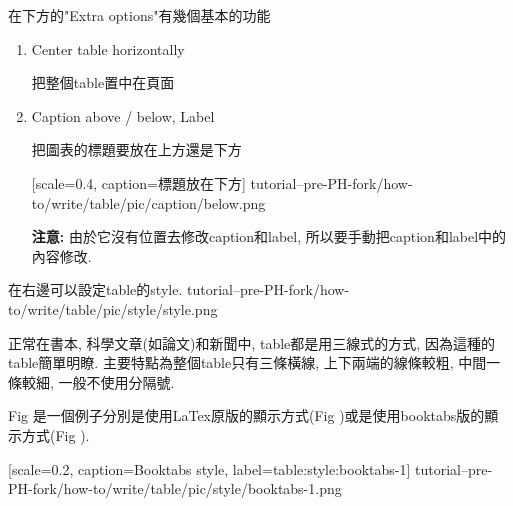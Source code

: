 \newpage
{}

  在下方的"Extra options"有幾個基本的功能

\begin{enumerate}

  \item
  {
  Center table horizontally

  把整個table置中在頁面

  } %

  \label{chapter:how-to:write:table:label-example}
  \item
  {
  Caption above / below, Label

  把圖表的標題要放在上方還是下方

    {
      [scale=0.4,
      caption={標題放在下方}]
      {tutorial--pre-PH-fork/how-to/write/table/pic/caption/below.png}
    }

  {\bf 注意:} 由於它沒有位置去修改caption和label, 所以要手動把caption和label中的內容修改.
  } %
\end{enumerate}

\newpage
{}

  在右邊可以設定table的style.
  \InsertFigure
    {tutorial--pre-PH-fork/how-to/write/table/pic/style/style.png}

   正常在書本, 科學文章(如論文)和新聞中, table都是用三線式的方式, 因為這種的table簡單明瞭. 主要特點為整個table只有三條橫線, 上下兩端的線條較粗, 中間一條較細, 一般不使用分隔號.

  Fig 是一個例子分別是使用LaTex原版的顯示方式(Fig )或是使用booktabs版的顯示方式(Fig ).

    {
      [scale=0.2,
      caption={Booktabs style},
      label={table:style:booktabs-1}]
      {tutorial--pre-PH-fork/how-to/write/table/pic/style/booktabs-1.png}
    }

